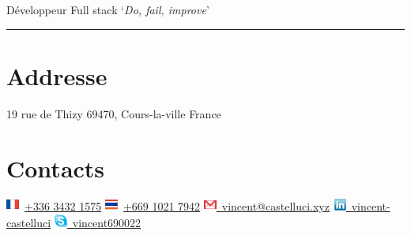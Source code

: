 \documentclass[]{friggeri-cv}
\begin{document}
      {Développeur Full stack}
\hfill \lq\textit{Do, fail, improve}\rq

\rule{397pt}{8pt}

\begin{aside}
  \section{Addresse}
  \hspace{1cm}
    19 rue de Thizy
    69470, Cours-la-ville
    France
  \section{Contacts}
  \hspace{1cm}
    \includegraphics[scale=0.60]{img/france.png}~\href{tel:+33634321575}{+336 3432 1575}
    \includegraphics[scale=0.60]{img/thailand.png}~\href{tel:+66910217942}{+669 1021 7942}
    \hspace{-2cm}\href{mailto:vincent.castelluci@gmail.com}{\includegraphics[scale=0.60]{img/mail.png}~vincent@castelluci.xyz}
    \href{https://www.linkedin.com/in/vincent-castelluci-363939170}{\includegraphics[scale=0.60]{img/linkedin.png}~vincent-castelluci}
    \href{skype://vincent690022?userinfo}{\includegraphics[scale=0.60]{img/skype.png}~vincent690022}
    ~

\end{aside}
\end{document}
